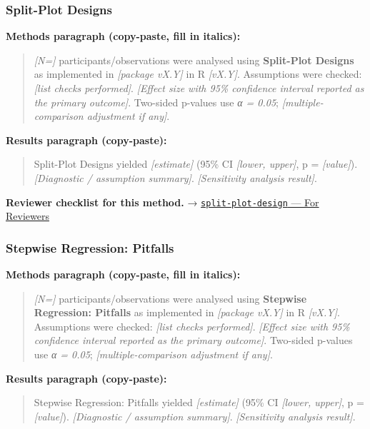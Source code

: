 \documentclass[
]{article}
\begin{document}
\subsubsection{Split-Plot Designs}\label{split-plot-designs}

\textbf{Methods paragraph (copy-paste, fill in italics):}

\begin{quote}
\emph{{[}N={]}} participants/observations were analysed using
\textbf{Split-Plot Designs} as implemented in \emph{{[}package vX.Y{]}}
in R \emph{{[}vX.Y{]}}. Assumptions were checked: \emph{{[}list checks
performed{]}}. \emph{{[}Effect size with 95\% confidence interval
reported as the primary outcome{]}}. Two-sided p-values use \emph{α =
0.05}; \emph{{[}multiple-comparison adjustment if any{]}}.
\end{quote}

\textbf{Results paragraph (copy-paste):}

\begin{quote}
Split-Plot Designs yielded \emph{{[}estimate{]}} (95\% CI
\emph{{[}lower, upper{]}}, p = \emph{{[}value{]}}). \emph{{[}Diagnostic
/ assumption summary{]}}. \emph{{[}Sensitivity analysis result{]}}.
\end{quote}

\textbf{Reviewer checklist for this method.} →
\href{../chapters/16-design/split-plot-design.Rmd\#for-reviewers}{\texttt{split-plot-design}
--- For Reviewers}

\subsubsection{Stepwise Regression:
Pitfalls}\label{stepwise-regression-pitfalls}

\textbf{Methods paragraph (copy-paste, fill in italics):}

\begin{quote}
\emph{{[}N={]}} participants/observations were analysed using
\textbf{Stepwise Regression: Pitfalls} as implemented in
\emph{{[}package vX.Y{]}} in R \emph{{[}vX.Y{]}}. Assumptions were
checked: \emph{{[}list checks performed{]}}. \emph{{[}Effect size with
95\% confidence interval reported as the primary outcome{]}}. Two-sided
p-values use \emph{α = 0.05}; \emph{{[}multiple-comparison adjustment if
any{]}}.
\end{quote}

\textbf{Results paragraph (copy-paste):}

\begin{quote}
Stepwise Regression: Pitfalls yielded \emph{{[}estimate{]}} (95\% CI
\emph{{[}lower, upper{]}}, p = \emph{{[}value{]}}). \emph{{[}Diagnostic
/ assumption summary{]}}. \emph{{[}Sensitivity analysis result{]}}.
\end{quote}
\end{document}
